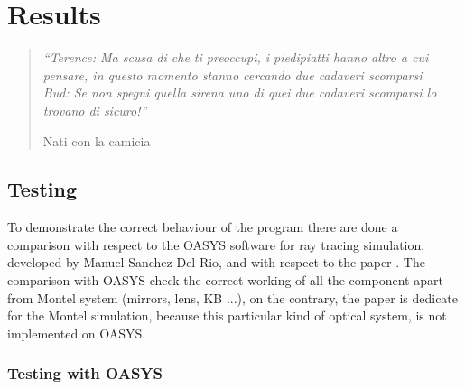 \chapter{Results}
\label{capitolo4}


\begin{quotation}
{\footnotesize
\noindent \emph{``Terence: Ma scusa di che ti preoccupi, i piedipiatti hanno altro a cui pensare, in questo momento stanno cercando due cadaveri scomparsi \\
Bud: Se non spegni quella sirena uno di quei due cadaveri scomparsi lo trovano di sicuro!''}
\begin{flushright}
Nati con la camicia
\end{flushright}
}
\end{quotation}
\vspace{0.5cm}

\section{Testing}
To demonstrate the correct behaviour of the program there are done a comparison  with respect to the OASYS software for ray tracing simulation, developed by Manuel Sanchez Del Rio, and with respect to the  paper \cite{resta2015nested}. The comparison with OASYS check the correct working of all the component apart from Montel system (mirrors, lens, KB ...), on the contrary, the paper is dedicate for the Montel simulation, because this particular kind of optical system, is not implemented on OASYS.
%
\subsection{Testing with OASYS}
%
